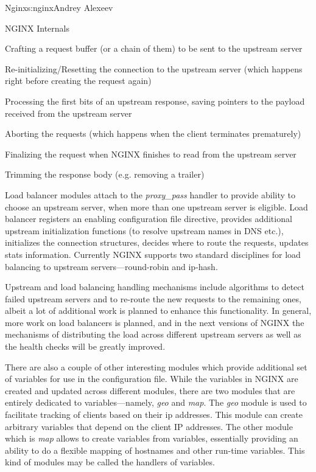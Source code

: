 \begin{aosachapter}{Nginx}{s:nginx}{Andrey Alexeev}
\begin{aosasect1}{NGINX Internals}
\begin{aosaitemize}

\item Crafting a request buffer (or a chain of them) to be sent to the
upstream server

\item Re-initializing/Resetting the connection to the upstream server
(which happens right before creating the request again)

\item Processing the first bits of an upstream response, saving
pointers to the payload received from the upstream server

\item Aborting the requests (which happens when the client terminates
prematurely)

\item Finalizing the request when NGINX finishes to read from the
upstream server

\item Trimming the response body (e.g. removing a trailer)

\end{aosaitemize}

Load balancer modules attach to the \emph{proxy\_pass} handler to
provide ability to choose an upstream server, when more than one
upstream server is eligible. Load balancer registers an enabling
configuration file directive, provides additional upstream
initialization functions (to resolve upstream names in DNS etc.),
initializes the connection structures, decides where to route the
requests, updates stats information. Currently NGINX supports two
standard disciplines for load balancing to upstream
servers---round-robin and ip-hash.

Upstream and load balancing handling mechanisms include algorithms to
detect failed upstream servers and to re-route the new requests to the
remaining ones, albeit a lot of additional work is planned to enhance
this functionality. In general, more work on load balancers is
planned, and in the next versions of NGINX the mechanisms of
distributing the load across different upstream servers as well as the
health checks will be greatly improved.

There are also a couple of other interesting modules which provide
additional set of variables for use in the configuration file. While
the variables in NGINX are created and updated across different
modules, there are two modules that are entirely dedicated to
variables---namely, \emph{geo} and \emph{map}. The \emph{geo} module
is used to facilitate tracking of clients based on their ip
addresses. This module can create arbitrary variables that depend on
the client IP addresses. The other module which is \emph{map} allows
to create variables from variables, essentially providing an ability
to do a flexible mapping of hostnames and other run-time
variables. This kind of modules may be called the handlers of
variables.


\end{aosasect1}
\end{aosachapter}
